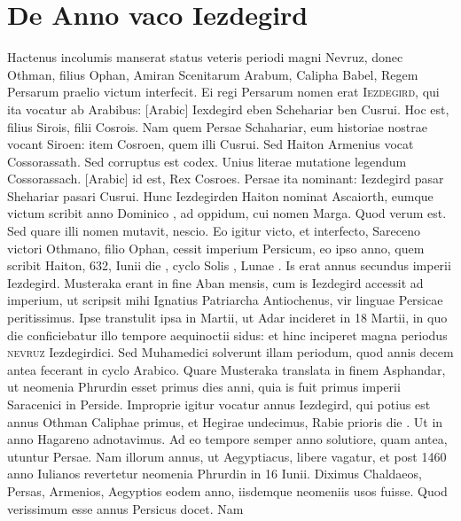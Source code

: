 \section{De Anno vaco Iezdegird}
%
Hactenus incolumis manserat status veteris periodi magni
Nevruz, donec Othman, filius Ophan, Amiran Scenitarum
Arabum, Calipha Babel, Regem Persarum praelio victum interfecit.
Ei regi Persarum nomen erat \textsc{Iezdegird}, qui ita vocatur
ab Arabibus: \textarabic{}[Arabic] Iexdegird eben
Schehariar ben Cusrui. %
Hoc est, filius Sirois, filii Cosrois.
Nam quem
Persae Schahariar, eum historiae nostrae vocant Siroen: item Cosroen,
quem illi Cusrui.
Sed Haiton Armenius vocat Cossorassath.
Sed corruptus est codex. %
Unius literae mutatione legendum Cossorassach.
%
\textarabic{}[Arabic] id est, Rex Cosroes.
Persae ita nominant:
Iezdegird pasar Shehariar pasari Cusrui.
Hunc Iezdegirden Haiton
nominat Ascaiorth, eumque %
 victum scribit anno Dominico ,
ad oppidum, cui nomen Marga.
Quod verum est.
Sed quare illi
nomen mutavit, nescio.
Eo igitur victo, et interfecto, Sareceno victori
Othmano, filio Ophan, cessit imperium Persicum, eo ipso
anno, quem scribit Haiton, 632, Iunii die , cyclo Solis ,
Lunae .
Is erat annus secundus imperii Iezdegird.
Musteraka
erant in fine Aban mensis, cum is Iezdegird accessit ad imperium,
ut scripsit mihi Ignatius Patriarcha Antiochenus, vir linguae
Persicae peritissimus.
Ipse transtulit ipsa in  Martii,
ut Adar incideret in 18 Martii, in quo die conficiebatur illo tempore
aequinoctii sidus: et hinc inciperet magna periodus \textsc{nevruz}
Iezdegirdici.
Sed Muhamedici solverunt illam periodum,
quod annis decem antea fecerant in cyclo Arabico.
%
%
Quare Musteraka
translata in finem Asphandar, ut neomenia Phrurdin esset primus
dies anni,
quia is fuit primus
imperii Saracenici
in Perside.
Improprie igitur
vocatur annus
Iezdegird, qui potius
est annus
Othman Caliphae
primus, et
Hegirae undecimus,
Rabie prioris
die .
Ut
in anno Hagareno
adnotavimus.
Ad eo tempore
semper anno solutiore,
quam antea,
utuntur Persae.
Nam illorum
annus, ut Aegyptiacus,
libere
vagatur, et post
1460 anno Iulianos
revertetur neomenia Phrurdin in 16 Iunii.
%
Diximus Chaldaeos,
Persas, Armenios, Aegyptios eodem anno, iisdemque neomeniis
usos fuisse.
Quod verissimum esse annus Persicus docet.
Nam





























